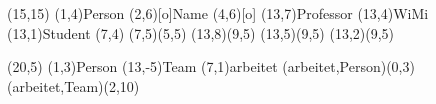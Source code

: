 \documentclass[a4paper,11pt]{article}
\begin{document}
\setlength{\unitlength}{.6cm}
\begin{schema}(15,15)
  \entity(1,4){Person}
  \attr(2,6)[o]{Name}
  \attr(4,6)[o]{}
  \relation(13,7){Professor}
  \relation(13,4){WiMi}
  \relation(13,1){Student}
  \cluster(7,4)
  \connection(7,5)(5,5){}
  \connection(13,8)(9,5){}
  \connection(13,5)(9,5){}
  \connection(13,2)(9,5){}
\end{schema}


\begin{schema}(20,5)
  \entity(1,3){Person}
  \entity(13,-5){Team}
  \relation(7,1){arbeitet}
  \conn(arbeitet,Person){(0,3)}
  \conn(arbeitet,Team){(2,10)}
\end{schema}
\end{document}
